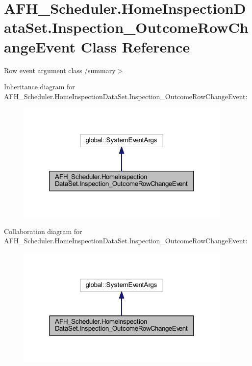 \section{A\+F\+H\+\_\+\+Scheduler.\+Home\+Inspection\+Data\+Set.\+Inspection\+\_\+\+Outcome\+Row\+Change\+Event Class Reference}
\label{class_a_f_h___scheduler_1_1_home_inspection_data_set_1_1_inspection___outcome_row_change_event}


Row event argument class /summary$>$  




Inheritance diagram for A\+F\+H\+\_\+\+Scheduler.\+Home\+Inspection\+Data\+Set.\+Inspection\+\_\+\+Outcome\+Row\+Change\+Event\+:
\nopagebreak
\begin{figure}[H]
\begin{center}
\leavevmode
\includegraphics[width=300pt]{class_a_f_h___scheduler_1_1_home_inspection_data_set_1_1_inspection___outcome_row_change_event__inherit__graph}
\end{center}
\end{figure}


Collaboration diagram for A\+F\+H\+\_\+\+Scheduler.\+Home\+Inspection\+Data\+Set.\+Inspection\+\_\+\+Outcome\+Row\+Change\+Event\+:
\nopagebreak
\begin{figure}[H]
\begin{center}
\leavevmode
\includegraphics[width=300pt]{class_a_f_h___scheduler_1_1_home_inspection_data_set_1_1_inspection___outcome_row_change_event__coll__graph}
\end{center}
\end{figure}
